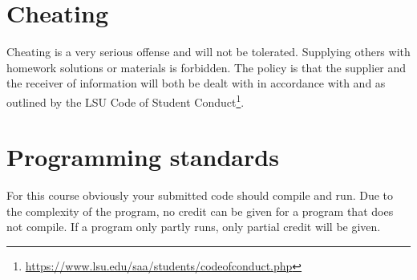 \documentclass[11pt,letterpaper]{article}
\begin{document}
\section*{Cheating}
Cheating is a very serious offense and will not be tolerated. Supplying others with homework solutions or materials is forbidden. The  policy  is  that  the supplier and the receiver of information will both be dealt with in accordance with and as outlined by the LSU Code of Student Conduct\footnote{\url{https://www.lsu.edu/saa/students/codeofconduct.php}}.

\section*{Programming standards}
For this course obviously your submitted code should compile and run. Due to the complexity of the program, no credit can be given for a program that does not compile. If a program only partly runs, only partial credit will be given.



\doclicenseThis
\end{document}
